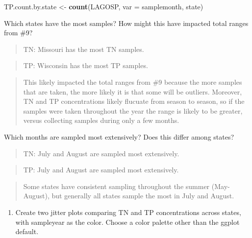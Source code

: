 \documentclass[]{article}
\newenvironment{Shaded}{\begin{snugshade}}{\end{snugshade}}
\newcommand{\DataTypeTok}[1]{\textcolor[rgb]{0.13,0.29,0.53}{#1}}
\newcommand{\KeywordTok}[1]{\textcolor[rgb]{0.13,0.29,0.53}{\textbf{#1}}}
\newcommand{\NormalTok}[1]{#1}
\newcommand{\StringTok}[1]{\textcolor[rgb]{0.31,0.60,0.02}{#1}}
\providecommand{\tightlist}{%
  \setlength{\itemsep}{0pt}\setlength{\parskip}{0pt}}
\begin{document}
\begin{Shaded}
\begin{Highlighting}[]
\NormalTok{TP.count.by.state <-}\StringTok{ }\KeywordTok{count}\NormalTok{(LAGOSP, }\DataTypeTok{var =}\NormalTok{ samplemonth, state)}
\end{Highlighting}
\end{Shaded}

Which states have the most samples? How might this have impacted total
ranges from \#9?

\begin{quote}
TN: Missouri has the most TN samples.
\end{quote}

\begin{quote}
TP: Wisconsin has the most TP samples.
\end{quote}

\begin{quote}
This likely impacted the total ranges from \#9 because the more samples
that are taken, the more likely it is that some will be outliers.
Moreover, TN and TP concentrations likely flucuate from season to
season, so if the samples were taken throughout the year the range is
likely to be greater, versus collecting samples during only a few
months.
\end{quote}

Which months are sampled most extensively? Does this differ among
states?

\begin{quote}
TN: July and August are sampled most extensively.
\end{quote}

\begin{quote}
TP: July and August are sampled most extensively.
\end{quote}

\begin{quote}
Some states have consistent sampling throughout the summer (May-August),
but generally all states sample the most in July and August.
\end{quote}

\begin{enumerate}
\def\labelenumi{\arabic{enumi}.}
\setcounter{enumi}{10}
\tightlist
\item
  Create two jitter plots comparing TN and TP concentrations across
  states, with sampleyear as the color. Choose a color palette other
  than the ggplot default.
\end{enumerate}
\end{document}
